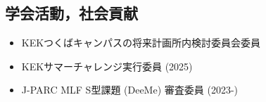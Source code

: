 \documentclass[11pt,a4paper,uplatex,dvipdfmx]{ujarticle} 		%
\newcommand{\研究課題名}{象の卵}
\newcommand{\研究機関名}{東京大学}
\newcommand{\研究代表者氏名}{内山雄祐}
\newcommand{\研究期間の最終元号年度}{6}  %
\begin{document}
\subsection{学会活動，社会貢献}
\begin{itemize}
\item KEKつくばキャンパスの将来計画所内検討委員会委員
\item KEKサマーチャレンジ実行委員 (2025)
\item J-PARC MLF S型課題 (DeeMe) 審査委員 (2023-)
\end{itemize}

\end{document}
